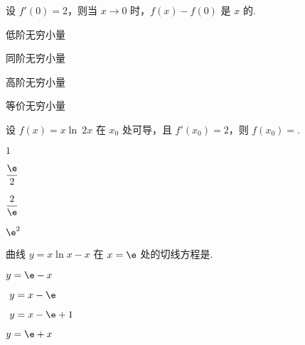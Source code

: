 \begin{problem}设 $f'\left( 0 \right) = 2$，则当 $x \rightarrow 0$
时，$f\left( x \right) - f(0)$ 是 $x$ 的.

\begin{abcd} \item 低阶无穷小量

\item 同阶无穷小量

\item 高阶无穷小量

\item 等价无穷小量

\end{abcd}

\end{problem}           

\begin{problem}设 $f\left( x \right) = x\ln\ 2x$ 在 $x_{0}$ 处可导，且
$f'\left( x_{0} \right) = 2$，则 $f\left( x_{0} \right) =$.

\begin{abcd} \item $1$

\item $\displaystyle \frac{\e}{2}$

\item $\displaystyle \frac{2}{\e}$

\item $\e^{2}$

\end{abcd}

\end{problem}           

\begin{problem}曲线 $y = x\ln x - x$ 在 $x = \e$ 处的切线方程是.

\begin{abcd} \item $y = \e - x$

\item $\ y = x - \e$

\item $\ y = x - \e + 1$

\item $y = \e + x$

\end{abcd}

\end{problem}           


